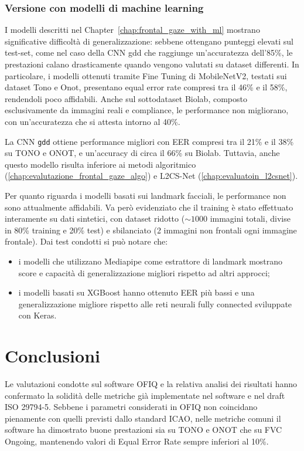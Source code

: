 \documentclass[12pt,a4paper,openright,twoside]{book}
\begin{document}
\subsection{Versione con modelli di machine learning}
I modelli descritti nel Chapter~\ref{chap:frontal_gaze_with_ml} mostrano significative difficoltà di generalizzazione: sebbene ottengano punteggi elevati sul test-set, come nel caso della CNN gdd che raggiunge un'accuratezza dell'85\%, le prestazioni calano drasticamente quando vengono valutati su dataset differenti. In particolare, i modelli ottenuti tramite Fine Tuning di MobileNetV2, testati sui dataset Tono e Onot, presentano equal error rate compresi tra il 46\% e il 58\%, rendendoli poco affidabili. Anche sul sottodataset Biolab, composto esclusivamente da immagini reali e compliance, le performance non migliorano, con un'accuratezza che si attesta intorno al 40\%.

La CNN \texttt{gdd} ottiene performance migliori con EER compresi tra il 21\% e il 38\% su TONO e ONOT, e un'accuracy di circa il 66\% su Biolab. Tuttavia, anche questo modello risulta inferiore ai metodi algoritmico (\ref{chap:evalutazione_frontal_gaze_algo}) e L2CS-Net (\ref{chap:evaluatoin_l2csnet}).  

Per quanto riguarda i modelli basati sui landmark facciali, le performance non sono attualmente affidabili. Va però evidenziato che il training è stato effettuato interamente su dati sintetici, con dataset ridotto (\(\sim1000\) immagini totali, divise in 80\% training e 20\% test) e sbilanciato (2 immagini non frontali ogni immagine frontale).
Dai test condotti si può notare che:
\begin{itemize}
    \item i modelli che utilizzano Mediapipe come estrattore di landmark mostrano score e capacità di generalizzazione migliori rispetto ad altri approcci;
    \item i modelli basati su XGBoost hanno ottenuto EER più bassi e una generalizzazione migliore rispetto alle reti neurali fully connected sviluppate con Keras.
\end{itemize}

\chapter{Conclusioni}
Le valutazioni condotte sul software OFIQ e la relativa analisi dei risultati hanno confermato la solidità delle metriche già implementate nel software e nel draft ISO 29794-5. Sebbene i parametri considerati in OFIQ non coincidano pienamente con quelli previsti dallo standard ICAO, nelle metriche comuni il software ha dimostrato buone prestazioni sia su TONO e ONOT che su FVC Ongoing, mantenendo valori di Equal Error Rate sempre inferiori al 10\%.  
\end{document}
